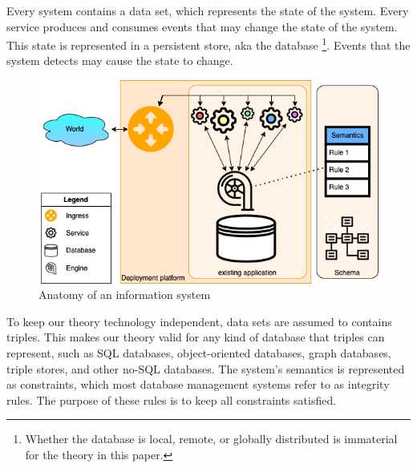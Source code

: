 \documentclass{elsarticle}
\begin{document}
   Every system contains a data set, which represents the state of the system.
   Every service produces and consumes events that may change the state of the system.
   This state is represented in a persistent store, aka the database%
\footnote{Whether the database is local, remote, or globally distributed is immaterial for the theory in this paper.}.
   Events that the system detects may cause the state to change.
\begin{figure}[bht]
   \begin{center}
     \includegraphics[scale=.45]{figures/datamigration-Pre-migration.png}
   \end{center}
\caption{Anatomy of an information system}
\label{fig:pre-migration}
\end{figure}
   To keep our theory technology independent, data sets are assumed to contains triples.
   This makes our theory valid for any kind of database that triples can represent,
   such as SQL databases, object-oriented databases, graph databases, triple stores, and other no-SQL databases.
   The system's semantics is represented as constraints,
   which most database management systems refer to as integrity rules.
   The purpose of these rules is to keep all constraints satisfied.
\end{document}
